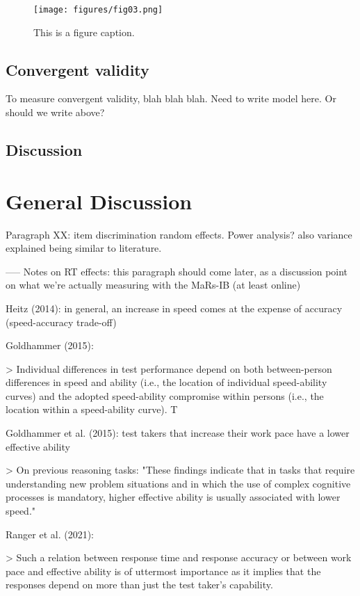 \documentclass[a4paper,man,natbib]{apa6}
\begin{document}
\begin{figure}
\centering
\texttt{[image: figures/fig03.png]}
\caption{\label{fig:fig03}This is a figure caption.}
\end{figure}

\subsection{Convergent validity}

To measure convergent validity, blah blah blah. Need to write model here. Or should we write above?

\subsection{Discussion}

\section{General Discussion}

Paragraph XX: item discrimination random effects. Power analysis? also variance explained being similar to literature.

-----
Notes on RT effects: this paragraph should come later, as a discussion point on what we're actually measuring with the MaRs-IB (at least online)

Heitz (2014): in general, an increase in speed comes at the expense of accuracy (speed-accuracy trade-off)

Goldhammer (2015): 

> Individual differences in test performance depend on both between-person differences in speed and ability (i.e., the location of individual speed-ability curves) and the adopted speed-ability compromise within persons (i.e., the location within a speed-ability curve). T

Goldhammer et al. (2015): test takers that increase their work pace have a lower effective ability

> On previous reasoning tasks: "These findings indicate that in tasks that require understanding new problem situations and in which the use of complex cognitive processes is mandatory, higher effective ability is usually associated with lower speed." 

Ranger et al. (2021): 

> Such a relation between response time and response accuracy or between work pace and effective ability is of uttermost importance as it implies that the responses depend on more than just the test taker’s capability.
\end{document}
